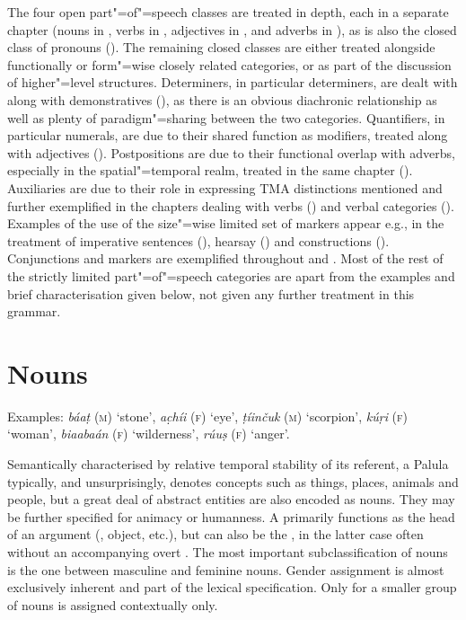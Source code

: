 The four open part"=of"=speech classes are treated in depth, each in a separate chapter (nouns in , verbs in , adjectives in , and adverbs in ), as is also the closed class of pronouns (). The remaining closed classes are either treated alongside functionally or form"=wise closely related categories, or as part of the discussion of higher"=level structures. Determiners, in particular  determiners, are dealt with along with  demonstratives (), as there is an obvious diachronic relationship as well as plenty of paradigm"=sharing between the two categories. Quantifiers, in particular numerals, are due to their shared function as  modifiers, treated along with adjectives (). Postpositions are due to their functional overlap with adverbs, especially in the spatial"=temporal realm, treated in the same chapter (). Auxiliaries are due to their role in expressing TMA distinctions mentioned and further exemplified in the chapters dealing with verbs () and verbal categories (). Examples of the use of the size"=wise limited set of  markers appear e.g., in the treatment of imperative sentences (), hearsay () and  constructions (). Conjunctions and  markers are exemplified throughout  and . Most of the rest of the strictly limited part"=of"=speech categories are apart from the examples and brief characterisation given below, not given any further treatment in this grammar.


\section{Nouns}
\label{sec:3b-2}
 
Examples: \textit{báaṭ} (\textsc{m}) `stone', \textit{ac̣híi} (\textsc{f}) `eye', \textit{ṭíinčuk} (\textsc{m}) `scorpion', \textit{kúṛi} (\textsc{f}) `woman',  \textit{biaabaán} (\textsc{f}) `wilderness', \textit{rúuṣ} (\textsc{f}) `anger'.


Semantically characterised by relative temporal stability of its referent, a Palula  typically, and unsurprisingly, denotes concepts such as things, places, animals and people, but a great deal of abstract entities are also encoded as nouns. They may be further specified for animacy or humanness. A  primarily functions as the head of an argument (, object, etc.), but can also be the , in the latter case often without an accompanying overt . The most important subclassification of nouns is the one between masculine and feminine  nouns. Gender assignment is almost exclusively inherent and part of the lexical specification. Only for a smaller group of nouns is  assigned contextually only.


